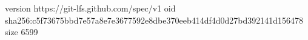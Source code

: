 version https://git-lfs.github.com/spec/v1
oid sha256:c5f73675bbd7e57a8e7e3677592e8dbe370eeb414df4d0d27bd392141d156478
size 6599
